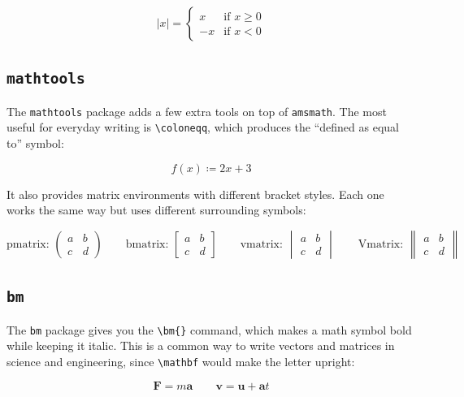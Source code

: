 \begin{equation}
	|x| = \begin{cases}
		x  & \text{if } x \geq 0 \\
		-x & \text{if } x < 0
	\end{cases}
\end{equation}

\subsection{\texttt{mathtools}}
The \texttt{mathtools} package adds a few extra tools on top of \texttt{amsmath}. The most useful for everyday writing is \texttt{\textbackslash coloneqq}, which produces the ``defined as equal to'' symbol:

\begin{equation}
	f(x) \coloneqq 2x + 3
\end{equation}

It also provides matrix environments with different bracket styles. Each one works the same way but uses different surrounding symbols:

\begin{equation}
	\text{pmatrix: }
	\begin{pmatrix} a & b \\ c & d \end{pmatrix} \qquad
	\text{bmatrix: }
	\begin{bmatrix} a & b \\ c & d \end{bmatrix} \qquad
	\text{vmatrix: }
	\begin{vmatrix} a & b \\ c & d \end{vmatrix} \qquad
	\text{Vmatrix: }
	\begin{Vmatrix} a & b \\ c & d \end{Vmatrix}
\end{equation}

\subsection{\texttt{bm}}
The \texttt{bm} package gives you the \texttt{\textbackslash bm\{\}} command, which makes a math symbol bold while keeping it italic. This is a common way to write vectors and matrices in science and engineering, since \texttt{\textbackslash mathbf} would make the letter upright:

\begin{equation}
	\bm{F} = m\bm{a} \qquad \bm{v} = \bm{u} + \bm{a}t
\end{equation}

